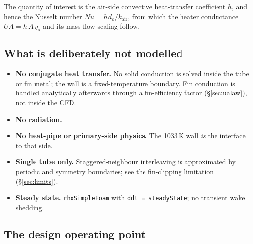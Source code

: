 \documentclass[11pt]{article}
\newcommand{\file}[1]{\texttt{\small #1}}
\begin{document}
The quantity of interest is the air-side convective heat-transfer coefficient $h$, and hence the Nusselt
number $Nu = h\,d_o/k_\mathrm{air}$, from which the heater conductance $UA = h\,A\,\eta_o$ and its mass-flow
scaling follow.

\subsection{What is deliberately not modelled}

\begin{itemize}[leftmargin=1.4em,itemsep=1pt]
\item \textbf{No conjugate heat transfer.} No solid conduction is solved inside the tube or fin metal; the
wall is a fixed-temperature boundary. Fin conduction is handled analytically afterwards through a
fin-efficiency factor (\S\ref{sec:ualaw}), not inside the CFD.
\item \textbf{No radiation.}
\item \textbf{No heat-pipe or primary-side physics.} The 1033\,K wall \emph{is} the interface to that side.
\item \textbf{Single tube only.} Staggered-neighbour interleaving is approximated by periodic and symmetry
boundaries; see the fin-clipping limitation (\S\ref{sec:limits}).
\item \textbf{Steady state.} \file{rhoSimpleFoam} with \file{ddt = steadyState}; no transient wake shedding.
\end{itemize}

\subsection{The design operating point}

\begin{table}[h]\centering\small
\caption{The single validated operating point. All values are model \emph{inputs} except $Re$, which is a
derived design target.}\label{tab:oppoint}
\end{table}
\end{document}

